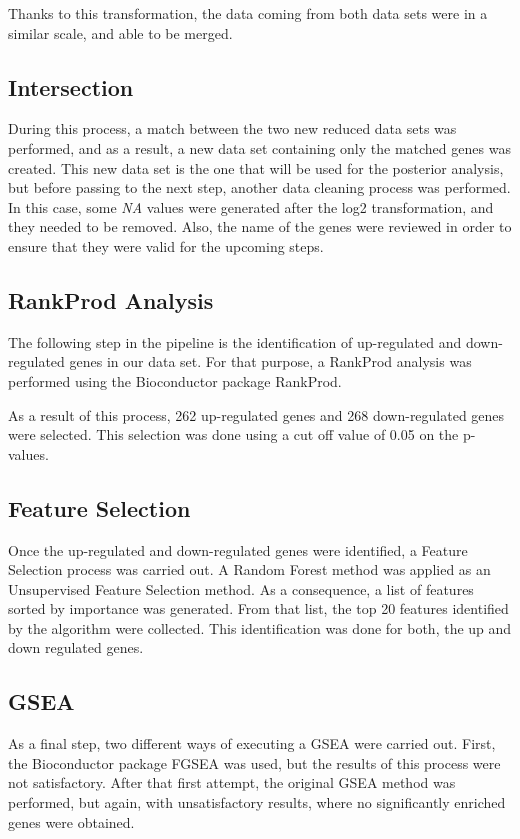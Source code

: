 Thanks to this transformation, the data coming from both data sets were in a similar scale, and able to be merged.

\subsection{Intersection}

During this process, a match between the two new reduced data sets was performed, and as a result, a new data set containing only the matched genes was created. This new data set is the one that will be used for the posterior analysis, but before passing to the next step, another data cleaning process was performed. In this case, some \textit{NA} values were generated after the log2 transformation, and they needed to be removed. Also, the name of the genes were reviewed in order to ensure that they were valid for the upcoming steps.

\subsection{RankProd Analysis}
The following step in the pipeline is the identification of up-regulated and down-regulated genes in our data set. For that purpose, a RankProd analysis was performed using the Bioconductor package RankProd. 

As a result of this process, 262 up-regulated genes and 268 down-regulated genes were selected. This selection was done using a cut off value of 0.05 on the p-values.

\subsection{Feature Selection}
Once the up-regulated and down-regulated genes were identified, a Feature Selection process was carried out. 
A Random Forest method was applied as an Unsupervised Feature Selection method.
As a consequence, a list of features sorted by importance was generated. From that list, the top 20 features identified by the algorithm were collected. This identification was done for both, the up and down regulated genes.

\subsection{GSEA}
As a final step, two different ways of executing a GSEA were carried out.
First, the Bioconductor package FGSEA\cite{fgsea} was used, but the results of this process were not satisfactory.
After that first attempt, the original GSEA method\cite{Subramanian15545} was performed, but again, with unsatisfactory results, where no significantly enriched genes were obtained.

